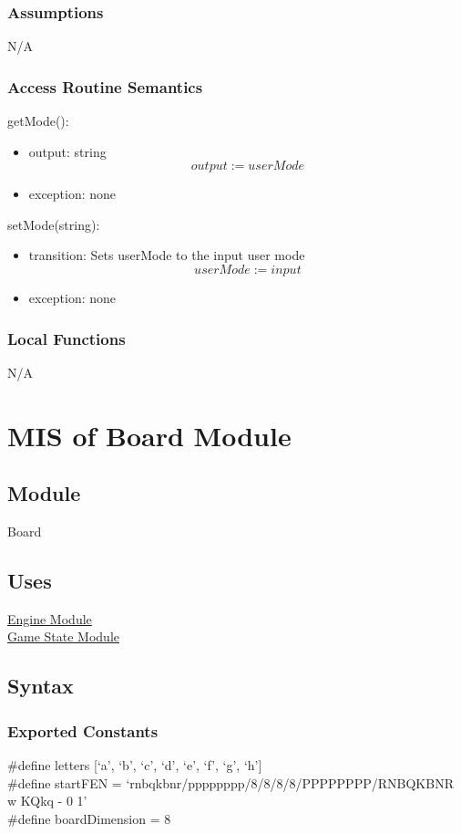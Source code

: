 \documentclass[12pt, titlepage]{article}
\begin{document}
    \subsubsection{Assumptions}
    N/A

    \subsubsection{Access Routine Semantics}
        \noindent getMode():
        \begin{itemize}
            \item output: string 
                \[output := userMode\]
            \item exception: none
        \end{itemize}

        \noindent setMode(string):
        \begin{itemize}
            \item transition: Sets userMode to the input user mode 
                \[userMode := input\]
            \item exception: none
        \end{itemize}

    \subsubsection{Local Functions}
    N/A

    \newpage

\section{MIS of Board Module} \label{mBoard}

    \subsection{Module}
    Board

    \subsection{Uses}
    \hyperref[mEngine]{Engine Module}\\
    \hyperref[mGame]{Game State Module}

    \subsection{Syntax}
    \subsubsection{Exported Constants}
        \#define letters [`a', `b', `c', `d', `e', `f', `g', `h']\\
        \#define startFEN = `rnbqkbnr/pppppppp/8/8/8/8/PPPPPPPP/RNBQKBNR w KQkq - 0 1'\\
        \#define boardDimension = 8
\end{document}
